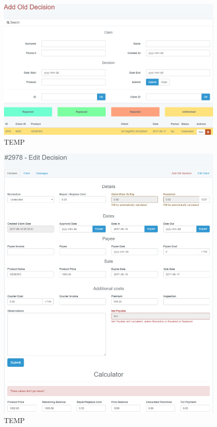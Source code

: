 	\begin{figure}
		\includegraphics[width=\linewidth]{../imagini/decisions_add_old.png}
		\caption{TEMP}
		\label{fig:TEMP}
	\end{figure}
	\begin{figure}
		\includegraphics[width=\linewidth]{../imagini/decisions_edit.png}
		\caption{TEMP}
		\label{fig:TEMP}
	\end{figure}
